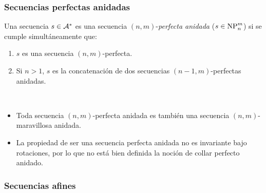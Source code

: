 \documentclass[11pt]{article}
\begin{document}
\subsubsection{Secuencias perfectas anidadas}

\begin{defi}
	Una secuencia $s \in \mathcal{A}^*$ es una secuencia $(n,m)$-\emph{perfecta
		anidada} ($s \in \text{NP}_{n}^{m}$) si se cumple simultáneamente que:
	\begin{enumerate}
		\item $s$ es una secuencia $(n,m)$-perfecta.
		\item Si $n > 1$, $s$ es la concatenación de dos secuencias
		      $(n-1,m)$-perfectas anidadas.
	\end{enumerate}
\end{defi}

\begin{obs}\ %
	\begin{itemize}
		\item Toda secuencia $(n,m)$-perfecta anidada es también una secuencia
		      $(n,m)$-maravillosa anidada.
		\item La propiedad de ser una secuencia perfecta anidada no es invariante
		      bajo rotaciones, por lo que no está bien definida la noción de collar
		      perfecto anidado.
	\end{itemize}
\end{obs}

\subsubsection{Secuencias afines}
\end{document}
